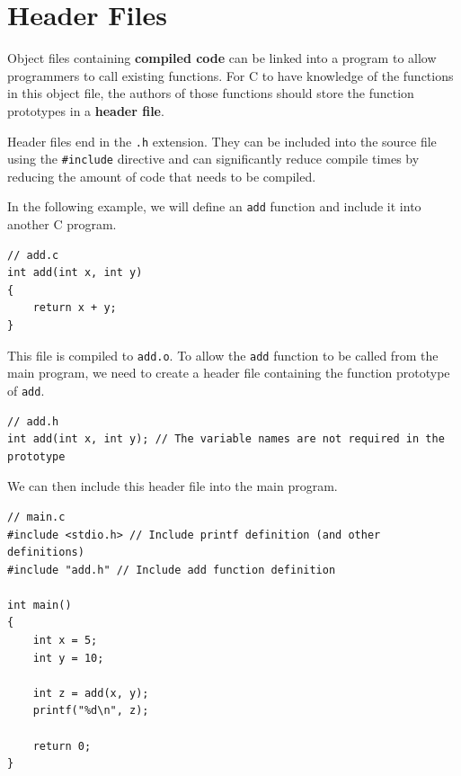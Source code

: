 \documentclass[a4paper]{report}
\begin{document}
\section{Header Files}
Object files containing \textbf{compiled code} can be linked into a program to allow programmers to
call existing functions. For C to have knowledge of the functions in this object file,
the authors of those functions should store the function prototypes in a \textbf{header file}.

Header files end in the \texttt{.h} extension.
They can be included into the source file using the \texttt{#include} directive and can significantly
reduce compile times by reducing the amount of code that needs to be compiled.

In the following example, we will define an \texttt{add} function and include
it into another C program.
\begin{verbatim}
// add.c
int add(int x, int y)
{
    return x + y;
}
\end{verbatim}
This file is compiled to \texttt{add.o}. To allow the \texttt{add} function to be called from the main program,
we need to create a header file containing the function prototype of \texttt{add}.
\begin{verbatim}
// add.h
int add(int x, int y); // The variable names are not required in the prototype
\end{verbatim}
We can then include this header file into the main program.
\begin{verbatim}
// main.c
#include <stdio.h> // Include printf definition (and other definitions)
#include "add.h" // Include add function definition

int main()
{
    int x = 5;
    int y = 10;

    int z = add(x, y);
    printf("%d\n", z);

    return 0;
}
\end{verbatim}
\end{document}
